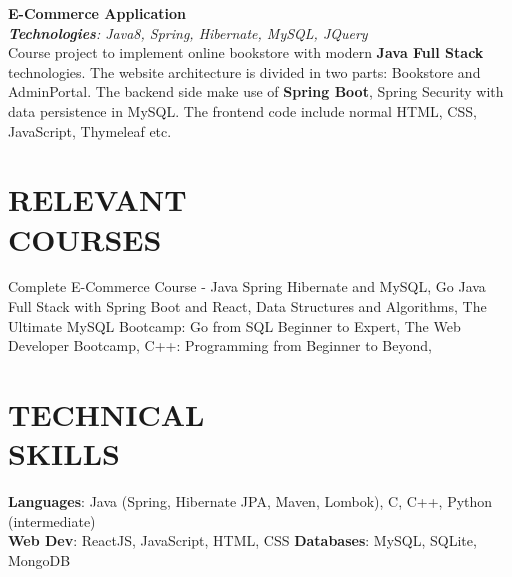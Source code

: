 \documentclass[resmargin]{res}
\begin{document}
\begin{resume}
\textbf{E-Commerce Application} {\sl  \hfill}
\\{\sl \textbf{Technologies}: Java8, Spring, Hibernate, MySQL, JQuery}
\\ Course project to implement online bookstore with modern \textbf{Java Full Stack} technologies. The website architecture is divided in two parts: Bookstore and AdminPortal. The backend side make use of \textbf{Spring Boot}, Spring Security with data persistence in MySQL. The frontend code include normal HTML, CSS, JavaScript, Thymeleaf etc.   

\section{RELEVANT\\ COURSES}
Complete E-Commerce Course - Java Spring Hibernate and MySQL, Go Java Full Stack with Spring Boot and React, Data Structures and Algorithms, The Ultimate MySQL Bootcamp: Go from SQL Beginner to Expert, The Web Developer Bootcamp, C++: Programming from Beginner to Beyond,

\section{TECHNICAL\\SKILLS}

\textbf{Languages}: Java (Spring, Hibernate JPA, Maven, Lombok), C, C++, Python (intermediate) \\
\textbf{Web Dev}: ReactJS, JavaScript, HTML, CSS            \qquad \textbf{Databases}: MySQL, SQLite, MongoDB





\end{resume}
\end{document}
